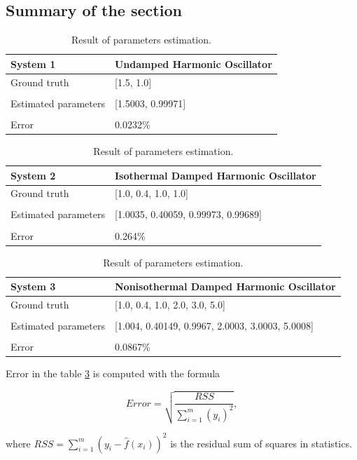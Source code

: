 \clearpage
\subsection{Summary of the section}

\begin{table}[h!]
	\centering
	\caption{Result of parameters estimation.}
	\label{tab:result_params_estimation}
	\begin{tabularx}{\textwidth}{ll}
		\toprule
		\textbf{System 1} & \textbf{Undamped Harmonic Oscillator} \\
		\midrule
		Ground truth & [1.5, 1.0] \\
		\tabularnewline
		Estimated parameters & [1.5003, 0.99971] \\
		\tabularnewline
		Error & 0.0232\% \\
	\end{tabularx}
	
	\begin{tabularx}{\textwidth}{ll}
		\toprule
		\textbf{System 2} & \textbf{Isothermal Damped Harmonic Oscillator} \\
		\midrule
		Ground truth & [1.0, 0.4, 1.0, 1.0] \\
		\tabularnewline
		Estimated parameters & [1.0035, 0.40059, 0.99973, 0.99689] \\
		\tabularnewline
		Error & 0.264\% \\
	\end{tabularx}
	
	\begin{tabularx}{\textwidth}{ll}
		\toprule
		\textbf{System 3} & \textbf{Nonisothermal Damped Harmonic Oscillator} \\
		\midrule
		Ground truth & [1.0, 0.4, 1.0, 2.0, 3.0, 5.0] \\
		\tabularnewline
		Estimated parameters & [1.004, 0.40149, 0.9967, 2.0003, 3.0003, 5.0008] \\
		\tabularnewline
		Error & 0.0867\% \\
		\bottomrule
	\end{tabularx}
\end{table}

Error in the table \ref{tab:result_params_estimation} is computed with the formula

\begin{equation}
Error = \sqrt{\frac{RSS}{\sum_{i=1}^{m}\left(y_{i}\right)^{2}}},
\end{equation}

where $RSS = \sum_{i=1}^{m}\left(y_{i}-\hat{f}\left(x_{i}\right)\right)^{2}$ is the residual sum of squares in statistics.


